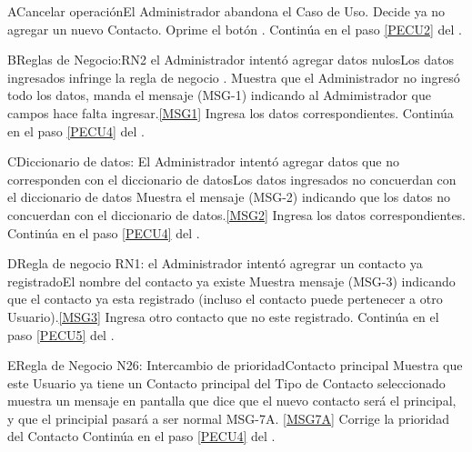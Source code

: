 	\begin{UCtrayectoriaA}{A}{Cancelar operación}{El Administrador abandona el Caso de Uso.}
			\UCpaso[\UCactor] Decide ya no agregar un nuevo Contacto.
			\UCpaso[\UCactor] Oprime el botón .
			\UCpaso Continúa en el paso \ref{PECU2} del .
	\end{UCtrayectoriaA}

        \begin{UCtrayectoriaA}{B}{Reglas de Negocio:RN2 el Administrador intentó agregar datos nulos}{Los datos ingresados infringe la regla de negocio .}
                        \UCpaso Muestra que el Administrador no ingresó todo los datos, manda el mensaje (MSG-1) indicando al Admimistrador que campos hace falta ingresar.\ref{MSG1}
			\UCpaso[\UCactor] Ingresa los datos correspondientes.
			\UCpaso Continúa en el paso \ref{PECU4} del .
	\end{UCtrayectoriaA}

        \begin{UCtrayectoriaA}{C}{Diccionario de datos: El Administrador intentó agregar datos que no corresponden con el diccionario de datos}{Los datos ingresados no concuerdan con el diccionario de datos}
                        \UCpaso Muestra el mensaje (MSG-2) indicando que los datos no concuerdan con el diccionario de datos.\ref{MSG2}
			\UCpaso[\UCactor] Ingresa los datos correspondientes.
			\UCpaso Continúa en el paso \ref{PECU4} del .
	\end{UCtrayectoriaA}

        \begin{UCtrayectoriaA}{D}{Regla de negocio RN1: el Administrador intentó agregrar un contacto ya registrado}{El nombre del contacto ya existe}
                        \UCpaso Muestra mensaje (MSG-3) indicando que el contacto ya esta registrado (incluso el contacto puede pertenecer a otro Usuario).\ref{MSG3}
			\UCpaso[\UCactor] Ingresa otro contacto que no este registrado.
			\UCpaso Continúa en el paso \ref{PECU5} del .
	\end{UCtrayectoriaA}

        \begin{UCtrayectoriaA}{E}{Regla de Negocio N26: Intercambio de prioridad}{Contacto principal}
                        \UCpaso Muestra que este Usuario ya tiene un Contacto principal del Tipo de Contacto seleccionado muestra un mensaje en pantalla que dice que el nuevo contacto será el principal, y que el principial pasará  a ser normal MSG-7A. \ref{MSG7A}
			\UCpaso[\UCactor] Corrige la prioridad del Contacto
			\UCpaso Continúa en el paso \ref{PECU4} del .
	\end{UCtrayectoriaA}


